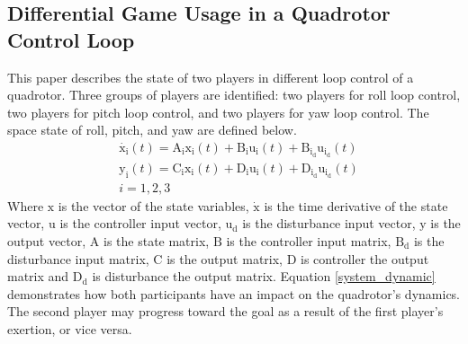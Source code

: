 \documentclass[conference]{IEEEtran}
\begin{document}
\subsection{Differential Game Usage in a Quadrotor Control Loop}
This paper describes the state of two players in different loop control of a quadrotor.
Three groups of players are identified: two players for roll loop control, two players for pitch loop control, and two players for yaw loop control.
The space state of roll, pitch, and yaw are defined below.
\begin{equation}\label{system_dynamic}
    \begin{split}
             &\boldsymbol{\dot{\mathrm{x_i}}}(t) = \boldsymbol{\mathrm{A_ix_i}}(t) + \boldsymbol{\mathrm{B_iu_i}}(t) + \boldsymbol{\mathrm{B_{i_d}u_{i_d}}}(t)%
        \\
        &\boldsymbol{\mathrm{y_i}}(t) = \boldsymbol{\mathrm{C_ix_i}}(t) + \boldsymbol{\mathrm{D_iu_i}}(t) + \boldsymbol{\mathrm{D_{i_d}u_{i_d}}}(t)\\
		& i =1, 2, 3
    \end{split}
\end{equation}
Where $\boldsymbol{\mathrm{x}}$ is the vector of the state variables, $\boldsymbol{\dot{\mathrm{x}}}$ is the time derivative of the state vector, $\boldsymbol{\mathrm{u}}$ is the controller input vector, $\boldsymbol{\mathrm{u_d}}$ is the disturbance input vector, $\boldsymbol{\mathrm{y}}$ is the output vector, $\boldsymbol{\mathrm{A}}$ is the state matrix, $\boldsymbol{\mathrm{B}}$ is the controller input matrix, $\boldsymbol{\mathrm{B_d}}$ is the disturbance input matrix,
$\boldsymbol{\mathrm{C}}$ is the output matrix, $\boldsymbol{\mathrm{D}}$ is controller the output matrix and $\boldsymbol{\mathrm{D_d}}$ is disturbance the output matrix.
Equation \eqref{system_dynamic} demonstrates how both participants have an impact on the quadrotor's dynamics.
The second player may progress toward the goal as a result of the first player's exertion, or vice versa.
\end{document}
